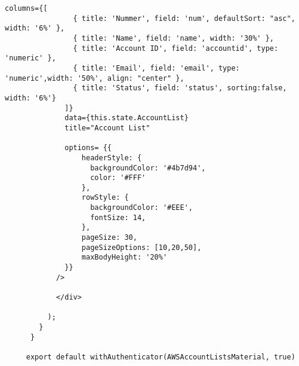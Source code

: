 \begin{lstlisting}[caption={React AccountsListMaterial.js},
label=lst:React AccountList,basicstyle=\ttfamily\small ]
              columns={[
                { title: 'Nummer', field: 'num', defaultSort: "asc", width: '6%' },
                { title: 'Name', field: 'name', width: '30%' },
                { title: 'Account ID', field: 'accountid', type: 'numeric' },
                { title: 'Email', field: 'email', type: 'numeric',width: '50%', align: "center" },
                { title: 'Status', field: 'status', sorting:false, width: '6%'}
              ]}
              data={this.state.AccountList}
              title="Account List"

              options= {{
                  headerStyle: {
                    backgroundColor: '#4b7d94',
                    color: '#FFF'
                  },
                  rowStyle: {
                    backgroundColor: '#EEE',
                    fontSize: 14,
                  },
                  pageSize: 30,
                  pageSizeOptions: [10,20,50],
                  maxBodyHeight: '20%'
              }}
            />

            </div>

          );
        }
      }

     export default withAuthenticator(AWSAccountListsMaterial, true)


\end{lstlisting}
